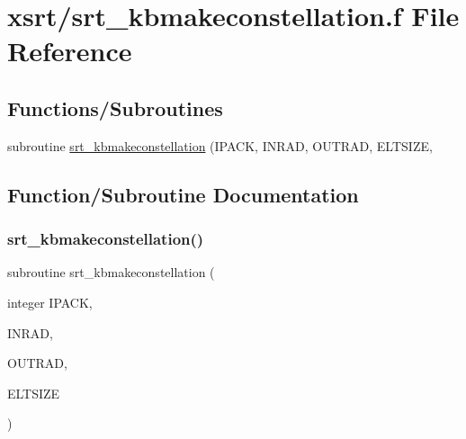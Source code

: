 \hypertarget{srt__kbmakeconstellation_8f}{}\section{xsrt/srt\+\_\+kbmakeconstellation.f File Reference}
\label{srt__kbmakeconstellation_8f}
\subsection*{Functions/\+Subroutines}
\begin{DoxyCompactItemize}
\item 
subroutine \hyperlink{srt__kbmakeconstellation_8f_abc40396d89273e92ddd2c86c5a051dcd}{srt\+\_\+kbmakeconstellation} (I\+P\+A\+CK, I\+N\+R\+AD, O\+U\+T\+R\+AD, E\+L\+T\+S\+I\+ZE,
\end{DoxyCompactItemize}


\subsection{Function/\+Subroutine Documentation}
\mbox{\label{srt__kbmakeconstellation_8f_abc40396d89273e92ddd2c86c5a051dcd}} 
\subsubsection{\texorpdfstring{srt\+\_\+kbmakeconstellation()}{srt\_kbmakeconstellation()}}
{\footnotesize\ttfamily subroutine srt\+\_\+kbmakeconstellation (\begin{DoxyParamCaption}\item[{integer}]{I\+P\+A\+CK,  }\item[{}]{I\+N\+R\+AD,  }\item[{}]{O\+U\+T\+R\+AD,  }\item[{}]{E\+L\+T\+S\+I\+ZE }\end{DoxyParamCaption})}


